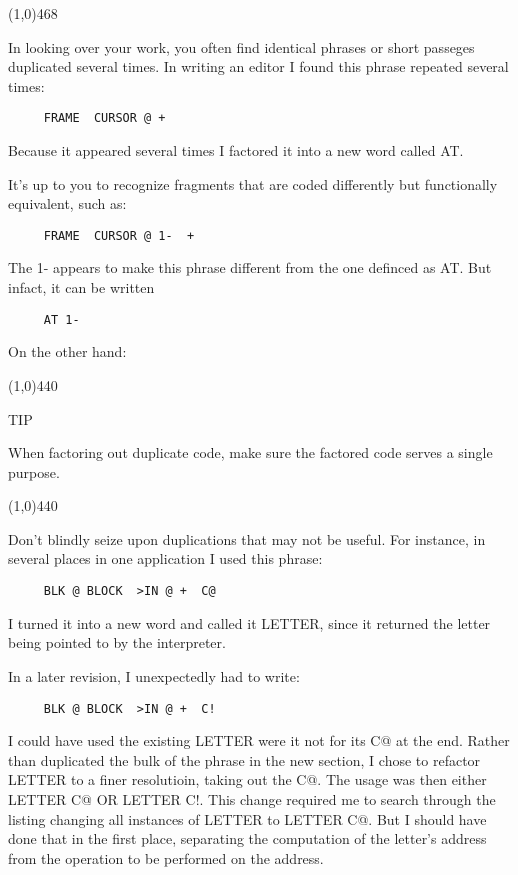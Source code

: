 \documentclass{book}
\begin{document}
\noindent
\line(1,0){468}

\bigskip

\noindent
In looking over your work, you often find identical phrases or short passeges duplicated several times. In writing an editor I found this phrase repeated several times:

\begin{verbatim}
     FRAME  CURSOR @ +
\end{verbatim}

\noindent
Because it appeared several times I factored it into a new word called AT.

It's up to you to recognize fragments that are coded differently but functionally equivalent, such as:

\begin{verbatim}
     FRAME  CURSOR @ 1-  +
\end{verbatim}

\noindent
The 1- appears to make this phrase different from the one definced as AT. But infact, it can be written

\begin{verbatim}
     AT 1-
\end{verbatim}

\noindent
On the other hand:

\line(1,0){440}

TIP

When factoring out duplicate code, make sure the factored code serves a single purpose.

\line(1,0){440}

\bigskip

\noindent
Don't blindly seize upon duplications that may not be useful. For instance, in several places in one application I used this phrase:

\begin{verbatim}
     BLK @ BLOCK  >IN @ +  C@
\end{verbatim}

\noindent
I turned it into a new word and called it LETTER, since it returned the letter being pointed to by the interpreter.

In a later revision, I unexpectedly had to write:

\begin{verbatim}
     BLK @ BLOCK  >IN @ +  C!
\end{verbatim}

\noindent
I could have used the existing LETTER were it not for its C@ at the end. Rather than duplicated the bulk of the phrase in the new section, I chose to refactor LETTER to a finer resolutioin, taking out the C@. The usage was then either LETTER C@ OR LETTER C!. This change required me to search through the listing changing all instances of LETTER to LETTER C@. But I should have done that in the first place, separating the computation of the letter's address from the operation to be performed on the address.
\end{document}
